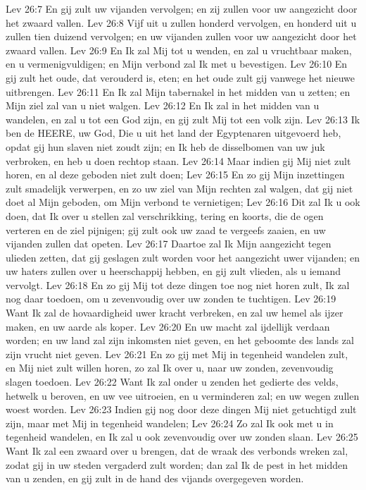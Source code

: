 Lev 26:7  En gij zult uw vijanden vervolgen; en zij zullen voor uw aangezicht door het zwaard vallen.
Lev 26:8  Vijf uit u zullen honderd vervolgen, en honderd uit u zullen tien duizend vervolgen; en uw vijanden zullen voor uw aangezicht door het zwaard vallen.
Lev 26:9  En Ik zal Mij tot u wenden, en zal u vruchtbaar maken, en u vermenigvuldigen; en Mijn verbond zal Ik met u bevestigen.
Lev 26:10  En gij zult het oude, dat verouderd is, eten; en het oude zult gij vanwege het nieuwe uitbrengen.
Lev 26:11  En Ik zal Mijn tabernakel in het midden van u zetten; en Mijn ziel zal van u niet walgen.
Lev 26:12  En Ik zal in het midden van u wandelen, en zal u tot een God zijn, en gij zult Mij tot een volk zijn.
Lev 26:13  Ik ben de HEERE, uw God, Die u uit het land der Egyptenaren uitgevoerd heb, opdat gij hun slaven niet zoudt zijn; en Ik heb de disselbomen van uw juk verbroken, en heb u doen rechtop staan.
Lev 26:14  Maar indien gij Mij niet zult horen, en al deze geboden niet zult doen;
Lev 26:15  En zo gij Mijn inzettingen zult smadelijk verwerpen, en zo uw ziel van Mijn rechten zal walgen, dat gij niet doet al Mijn geboden, om Mijn verbond te vernietigen;
Lev 26:16  Dit zal Ik u ook doen, dat Ik over u stellen zal verschrikking, tering en koorts, die de ogen verteren en de ziel pijnigen; gij zult ook uw zaad te vergeefs zaaien, en uw vijanden zullen dat opeten.
Lev 26:17  Daartoe zal Ik Mijn aangezicht tegen ulieden zetten, dat gij geslagen zult worden voor het aangezicht uwer vijanden; en uw haters zullen over u heerschappij hebben, en gij zult vlieden, als u iemand vervolgt.
Lev 26:18  En zo gij Mij tot deze dingen toe nog niet horen zult, Ik zal nog daar toedoen, om u zevenvoudig over uw zonden te tuchtigen.
Lev 26:19  Want Ik zal de hovaardigheid uwer kracht verbreken, en zal uw hemel als ijzer maken, en uw aarde als koper.
Lev 26:20  En uw macht zal ijdellijk verdaan worden; en uw land zal zijn inkomsten niet geven, en het geboomte des lands zal zijn vrucht niet geven.
Lev 26:21  En zo gij met Mij in tegenheid wandelen zult, en Mij niet zult willen horen, zo zal Ik over u, naar uw zonden, zevenvoudig slagen toedoen.
Lev 26:22  Want Ik zal onder u zenden het gedierte des velds, hetwelk u beroven, en uw vee uitroeien, en u verminderen zal; en uw wegen zullen woest worden.
Lev 26:23  Indien gij nog door deze dingen Mij niet getuchtigd zult zijn, maar met Mij in tegenheid wandelen;
Lev 26:24  Zo zal Ik ook met u in tegenheid wandelen, en Ik zal u ook zevenvoudig over uw zonden slaan.
Lev 26:25  Want Ik zal een zwaard over u brengen, dat de wraak des verbonds wreken zal, zodat gij in uw steden vergaderd zult worden; dan zal Ik de pest in het midden van u zenden, en gij zult in de hand des vijands overgegeven worden.
